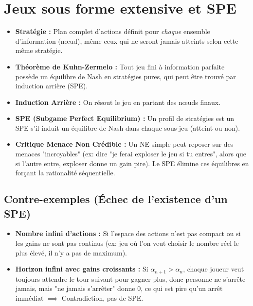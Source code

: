 \documentclass[10pt,a4paper]{article}
\begin{document}
\section{Jeux sous forme extensive et SPE}
\begin{itemize}[leftmargin=*]
    \item \textbf{Stratégie :} Plan complet d'actions définit pour \textit{chaque} ensemble d'information (nœud), même ceux qui ne seront jamais atteints selon cette même stratégie.
    \item \textbf{Théorème de Kuhn-Zermelo :} Tout jeu fini à information parfaite possède un équilibre de Nash en stratégies pures, qui peut être trouvé par induction arrière (SPE).
    \item \textbf{Induction Arrière :} On résout le jeu en partant des nœuds finaux.
    \item \textbf{SPE (Subgame Perfect Equilibrium) :} Un profil de stratégies est un SPE s'il induit un équilibre de Nash dans chaque sous-jeu (atteint ou non).
    \item \textbf{Critique Menace Non Crédible :} Un NE simple peut reposer sur des menaces "incroyables" (ex: dire "je ferai exploser le jeu si tu entres", alors que si l'autre entre, exploser donne un gain pire). Le SPE élimine ces équilibres en forçant la rationalité séquentielle.
\end{itemize}

\subsection{Contre-exemples (Échec de l'existence d'un SPE)}
\begin{itemize}
    \item \textbf{Nombre infini d'actions :} Si l'espace des actions n'est pas compact ou si les gains ne sont pas continus (ex: jeu où l'on veut choisir le nombre réel le plus élevé, il n'y a pas de maximum).
    \item \textbf{Horizon infini avec gains croissants :} Si $\alpha_{n+1} > \alpha_n$, chaque joueur veut toujours attendre le tour suivant pour gagner plus, donc personne ne s'arrête jamais, mais "ne jamais s'arrêter" donne 0, ce qui est pire qu'un arrêt immédiat $\implies$ Contradiction, pas de SPE.
\end{itemize}
\end{document}
